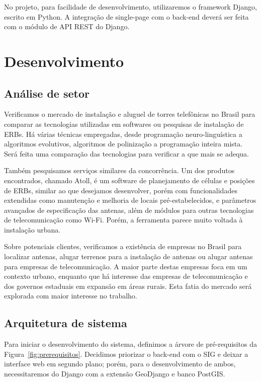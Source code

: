 \documentclass[12pt,a4paper]{article}
\begin{document}
No projeto, para facilidade de desenvolvimento, utilizaremos o framework Django,
escrito em Python. A integração de single-page com o back-end deverá ser feita
com o módulo de API REST do Django.

\section{Desenvolvimento}

\subsection{Análise de setor}

Verificamos o mercado de instalação e aluguel de torres telefônicas no Brasil
para comparar as tecnologias utilizadas em softwares ou pesquisas de instalação
de ERBs. Há várias técnicas empregadas, desde programação neuro-linguística a
algoritmos evolutivos, algoritmos de polinização a programação inteira mista.
Será feita uma comparação das tecnologias para verificar a que mais se adequa.

Também pesquisamos serviços similares da concorrência. Um dos
produtos encontrados, chamado Atoll, é um software de planejamento de células e
posições de ERBs, similar ao que desejamos desenvolver, porém com funcionalidades
extendidas como manutenção e melhoria de locais pré-estabelecidos, e parâmetros
avançados de especificação das antenas, além de módulos para outras tecnologias
de telecomunicação como Wi-Fi. Porém, a ferramenta parece muito voltada à
instalação urbana.

Sobre potenciais clientes, verificamos a existência de empresas no Brasil para
localizar antenas, alugar terrenos para a instalação de antenas ou alugar
antenas para empresas de telecomunicação. A maior parte destas empresas foca em
um contexto urbano, enquanto que há interesse das empresas de telecomunicação
e dos governos estaduais em expansão em áreas rurais. Esta fatia do mercado
será explorada com maior interesse no trabalho.

\subsection{Arquitetura de sistema}

Para iniciar o desenvolvimento do sistema, definimos a árvore de pré-requisitos da
Figura~\ref{fig:prerequisitos}. Decidimos priorizar o back-end com o SIG e
deixar a interface web em segundo plano; porém, para o desenvolvimento de ambos,
necessitaremos do Django com a extensão GeoDjango e banco PostGIS.
\end{document}
